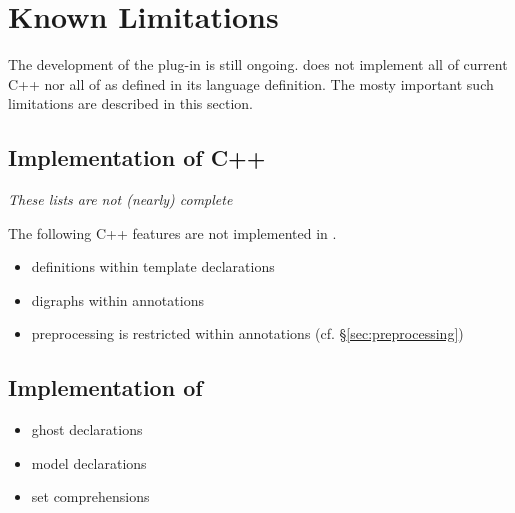 \chapter{Known Limitations}

The development of the \fclang plug-in is still ongoing.
\fclang does not implement all of current C++ nor all of 
\acslpp as defined in its language definition.\cite{acslpp}
The mosty important such limitations are described in this section.

\section{Implementation of C++}

\textit{These lists are not (nearly) complete}

The following C++ features are not implemented in \acslpp.
\begin{itemize}
\item \acslpp definitions within template declarations
\item digraphs within \acslpp annotations
\item preprocessing is restricted within \acslpp annotations (cf. \S\ref{sec:preprocessing})
\end{itemize}

\section{Implementation of \acslpp}

\begin{itemize}

\item ghost declarations
\item model declarations
\item set comprehensions
\end{itemize}
